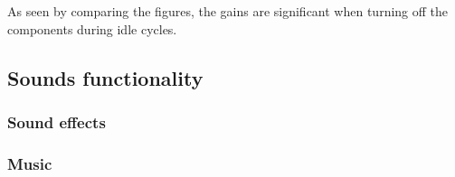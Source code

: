 


As seen by comparing the figures, the gains are significant when turning off the components during idle cycles. 


\subsection{Sounds functionality}



\subsubsection{Sound effects}


\subsubsection{Music}


